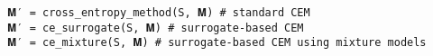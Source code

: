 \begin{lstlisting}[language=JuliaLocal]
𝐌′ = cross_entropy_method(S, 𝐌) # standard CEM
𝐌′ = ce_surrogate(S, 𝐌) # surrogate-based CEM
𝐌′ = ce_mixture(S, 𝐌) # surrogate-based CEM using mixture models
\end{lstlisting}
